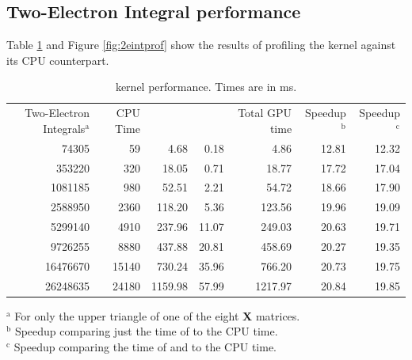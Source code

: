 \subsection{Two-Electron Integral performance}
Table \ref{tab:2eintprof} and Figure \ref{fig:2eintprof} show the results of profiling the  kernel against its CPU counterpart.

\begin{table}[h!]
\begin{center}
\caption[ kernel performance]{ kernel performance. Times are in ms.}
\label{tab:2eintprof}
\begin{tabular}{rrrrrrr}
\toprule
	\multirow{3}{2cm}{Two-Electron Integrals$^{\textrm{a}}$}	&	\multirow{3}{*}{CPU Time}		&	\multirow{3}{*}{\kernel{eint2}}	&	\multirow{3}{2.4cm}{{binary\_search}}		&	\multirow{3}{1cm}{Total GPU time}	&	\multirow{3}{*}{Speedup$^{\textrm{b}}$}	&	\multirow{3}{*}{Speedup$^{\textrm{c}}$}	\\
	\\
	\\
\midrule
	74305	&	59		&	4.68		&	0.18		&	4.86		&	12.81	&	12.32	\\
	353220	&	320		&	18.05	&	0.71		&	18.77	&	17.72	&	17.04	\\
	1081185	&	980		&	52.51	&	2.21		&	54.72	&	18.66	&	17.90	\\
	2588950	&	2360		&	118.20	&	5.36		&	123.56	&	19.96	&	19.09	\\
	5299140	&	4910		&	237.96	&	11.07	&	249.03	&	20.63	&	19.71	\\
	9726255	&	8880		&	437.88	&	20.81	&	458.69	&	20.27	&	19.35	\\
	16476670	&	15140	&	730.24	&	35.96	&	766.20	&	20.73	&	19.75	\\
	26248635	&	24180	&	1159.98	&	57.99	&	1217.97	&	20.84	&	19.85	\\
\bottomrule
\end{tabular}
\end{center}
$^{\textrm{a}}$ For only the upper triangle of one of the eight \textbf{X} matrices. \\
$^{\textrm{b}}$ Speedup comparing just the time of  to the CPU time. \\
$^{\textrm{c}}$ Speedup comparing the time of  and  to the CPU time. \\
\end{table}

